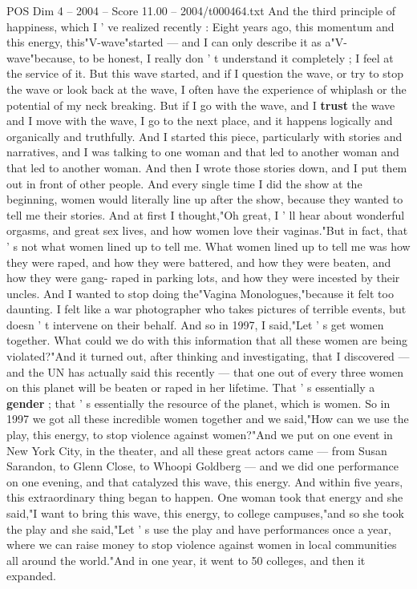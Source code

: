 \begin{textsample}{POS Dim 4 – 2004 – Score 11.00 – 2004/t000464.txt}
And the third principle of happiness, which I ' ve realized recently : Eight years ago, this momentum and this energy, this"V-wave"started — and I can only describe it as a"V-wave"because, to be honest, I really don ' t understand it completely ; I feel at the service of it.
But this wave started, and if I question the wave, or try to stop the wave or look back at the wave, I often have the experience of whiplash or the potential of my neck breaking.
But if I go with the wave, and I \textbf{trust} the wave and I move with the wave, I go to the next place, and it happens logically and organically and truthfully.
And I started this piece, particularly with stories and narratives, and I was talking to one woman and that led to another woman and that led to another woman.
And then I wrote those stories down, and I put them out in front of other people.
And every single time I did the show at the beginning, women would literally line up after the show, because they wanted to tell me their stories.
And at first I thought,"Oh great, I ' ll hear about wonderful orgasms, and great sex lives, and how women love their vaginas."But in fact, that ' s not what women lined up to tell me.
What women lined up to tell me was how they were raped, and how they were battered, and how they were beaten, and how they were gang- raped in parking lots, and how they were incested by their uncles.
And I wanted to stop doing the"Vagina Monologues,"because it felt too daunting.
I felt like a war photographer who takes pictures of terrible events, but doesn ' t intervene on their behalf.
And so in 1997, I said,"Let ' s get women together.
What could we do with this information that all these women are being violated?"And it turned out, after thinking and investigating, that I discovered — and the UN has actually said this recently — that one out of every three women on this planet will be beaten or raped in her lifetime.
That ' s essentially a \textbf{gender} ; that ' s essentially the resource of the planet, which is women.
So in 1997 we got all these incredible women together and we said,"How can we use the play, this energy, to stop violence against women?"And we put on one event in New York City, in the theater, and all these great actors came — from Susan Sarandon, to Glenn Close, to Whoopi Goldberg — and we did one performance on one evening, and that catalyzed this wave, this energy.
And within five years, this extraordinary thing began to happen.
One woman took that energy and she said,"I want to bring this wave, this energy, to college campuses,"and so she took the play and she said,"Let ' s use the play and have performances once a year, where we can raise money to stop violence against women in local communities all around the world."And in one year, it went to 50 colleges, and then it expanded.

\end{textsample}

